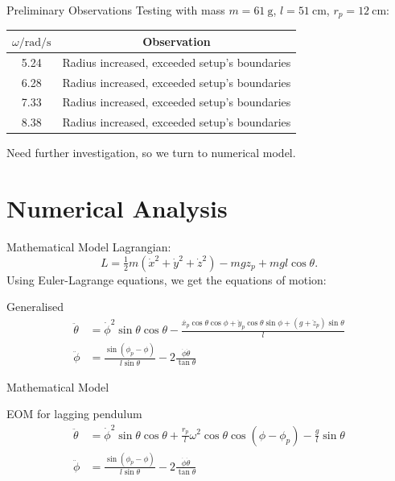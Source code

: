 \documentclass[10pt, compress]{beamer}
\begin{document}
\begin{frame}{Preliminary Observations}
    Testing with mass $m=\SI{61}{\gram}$, $l=\SI{51}{\centi\metre}$, $r_p=\SI{12}{\centi\metre}$:
    
    \begin{center}
    \begin{tabular}{c c}
        \hline
        $\omega / \si{\radian\per\second}$ & Observation \\
        \hline
        5.24 & Radius increased, exceeded setup's boundaries\\
        6.28 & Radius increased, exceeded setup's boundaries\\
        7.33 & Radius increased, exceeded setup's boundaries\\
        8.38 & Radius increased, exceeded setup's boundaries\\
        \hline
    \end{tabular}
    \end{center}
    
    Need further investigation, so we turn to numerical model.
\end{frame}

\section{Numerical Analysis}

\begin{frame}{Mathematical Model}
    Lagrangian:
    \begin{equation*}
        L = \tfrac{1}{2}m\left(\dot{x}^2 + \dot{y}^2 + \dot{z}^2\right) - mgz_p + mgl\cos\theta.
    \end{equation*}
    Using Euler-Lagrange equations, we get the equations of motion:
    \begin{block}{Generalised}
    \begin{align*}
        \ddot{\theta} &= \dot{\phi}^2 \sin\theta\cos\theta
            - \frac{
                \ddot{x_p}\cos\theta\cos\phi + \ddot{y}_p\cos\theta\sin\phi +
                (g + \ddot{z}_p)\sin\theta}{l}\\
        \ddot{\phi} &= \frac{\sin(\phi_p-\phi)}{l\sin\theta} - 2 \frac{\dot{\phi}\dot{\theta}}{\tan\theta}
    \end{align*}
    \end{block}
\end{frame}

\begin{frame}{Mathematical Model}
    \begin{block}{EOM for lagging pendulum}
    \begin{align*}
        \ddot{\theta} &= \dot{\phi}^2 \sin\theta\cos\theta + \frac{r_p}{l} \omega^2 \cos\theta\cos(\phi-\phi_p) - \frac{g}{l}\sin\theta\\
        \ddot{\phi} &= \frac{\sin(\phi_p-\phi)}{l\sin\theta} - 2 \frac{\dot{\phi}\dot{\theta}}{\tan\theta}
    \end{align*}
    \end{block}
\end{frame}
\end{document}

